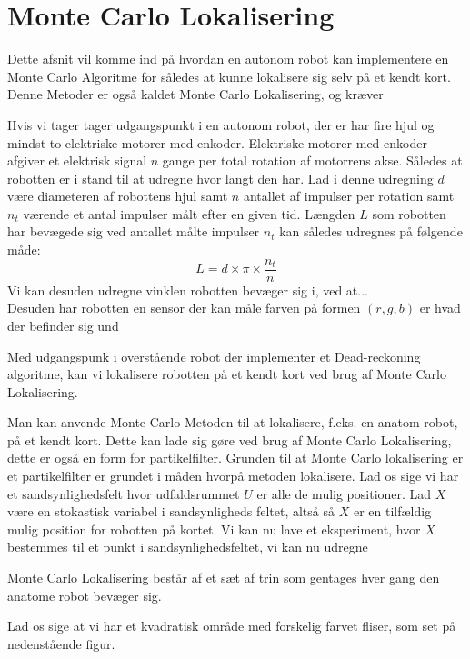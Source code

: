 \documentclass[../../SRP.tex]{subfiles}
\begin{document}
\chapter{Monte Carlo Lokalisering}
Dette afsnit vil komme ind på hvordan en autonom robot kan implementere en Monte Carlo Algoritme for således at kunne lokalisere sig selv på et kendt kort. Denne Metoder er også kaldet Monte Carlo Lokalisering, og kræver  

Hvis vi tager tager udgangspunkt i en autonom robot, der er har fire hjul og mindst to elektriske motorer med enkoder. Elektriske motorer med enkoder afgiver et elektrisk signal $n$ gange per total rotation af motorrens akse. Således at robotten er i stand til at udregne hvor langt den har. Lad i denne udregning $d$ være diameteren af robottens hjul samt $n$ antallet af impulser per rotation samt $n_t$ værende et antal impulser målt efter en given tid. Længden $L$ som robotten har bevægede sig ved antallet målte impulser $n_t$ kan således udregnes på følgende måde:
\begin{equation}
  L = d \times \pi \times \frac{n_t}{n}
\end{equation}
Vi kan desuden udregne vinklen robotten bevæger sig i, ved at... \\

Desuden har robotten en sensor der kan måle farven på formen $(r,g,b)$ er hvad der befinder sig und

Med udgangspunk i overstående robot der implementer et Dead-reckoning algoritme, kan vi lokalisere robotten på et kendt kort ved brug af Monte Carlo Lokalisering.

Man kan anvende Monte Carlo Metoden til at lokalisere, f.eks. en anatom robot, på et kendt kort. Dette kan lade sig gøre ved brug af Monte Carlo Lokalisering, dette er også en form for partikelfilter. Grunden til at Monte Carlo lokalisering er et partikelfilter er grundet i måden hvorpå metoden lokalisere. Lad os sige vi har et sandsynlighedsfelt hvor udfaldsrummet $U$ er alle de mulig positioner. Lad $X$ være en stokastisk variabel i sandsynligheds feltet, altså så $X$ er en tilfældig mulig position for robotten på kortet. Vi kan nu lave et eksperiment, hvor $X$ bestemmes til et punkt i sandsynlighedsfeltet, vi kan nu udregne 

Monte Carlo Lokalisering består af et sæt af trin som gentages hver gang den anatome robot bevæger sig. 

Lad os sige at vi har et kvadratisk område med forskelig farvet fliser, som set på nedenstående figur. \\
\end{document}
